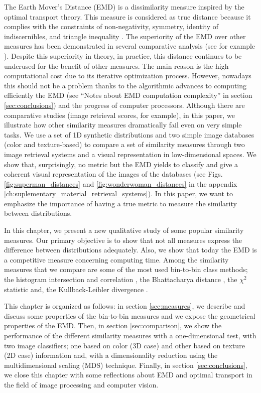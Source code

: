 The Earth Mover's Distance (EMD) \citep{Rubner.Tomasi.ea:IJCV:2000} is a dissimilarity measure inspired by the optimal transport theory. This measure is considered as true distance because it complies with the constraints of non-negativity, symmetry, identity of indiscernibles, and triangle inequality \citep{Peyre.Cuturi:arXiv:2018}. The superiority of the EMD over other measures has been demonstrated in several comparative analysis (see for example \citep{Puzicha.Buhmann.ea:ICCV:1999, Rubner.Tomasi.ea:IJCV:2000}). Despite this superiority in theory, in practice, this distance continues to be underused for the benefit of other measures. The main reason is the high computational cost due to its iterative optimization process. However, nowadays this should not be a problem thanks to the algorithmic advances to computing efficiently the EMD (see ``Notes about EMD computation complexity'' in section \ref{sec:conclusions}) and the progress of computer processors. Although there are comparative studies (image retrieval scores, for example), in this paper, we illustrate how other similarity measures dramatically fail even on very simple tasks. We use a set of 1D synthetic distributions and two simple image databases (color and texture-based) to compare a set of similarity measures through two image retrieval systems and a visual representation in low-dimensional spaces. We show that, surprisingly, no metric but the EMD yields to classify and give a coherent visual representation of the images of the databases (see Figs. \ref{fig:superman_distances} and \ref{fig:wonderwoman_distances} in the appendix \ref{ch:suplementary_material_retrieval_systems}). In this paper, we want to emphasize the importance of having a true metric to measure the similarity between distributions.

In this chapter, we present a new qualitative study of some popular similarity measures. Our primary objective is to show that not all measures express the difference between distributions adequately. Also, we show that today the EMD is a competitive measure concerning computing time. Among the similarity measures that we compare are some of the most used bin-to-bin class methods; the histogram intersection and correlation \citep{Nejhum.Ho.ea:CVPR:2008}, the Bhattacharya distance \citep{So.Chung:JPR:2017}, the $\chi^2$ statistic and, the  Kullback-Leibler divergence \citep{Klein.Frintrop:CV:2011}. 

This chapter is organized as follows: in section \ref{sec:measures}, we describe and discuss some properties of the bin-to-bin measures and we expose the geometrical properties of the EMD. Then, in section \ref{sec:comparison}, we show the performance of the different similarity measures with a one-dimensional test, with two image classifiers; one based on color (3D case) and other based on texture (2D case) information and, with a dimensionality reduction using the multidimensional scaling (MDS) technique. Finally, in section \ref{sec:conclusions}, we close this chapter with some reflections about EMD and optimal transport in the field of image processing and computer vision.


